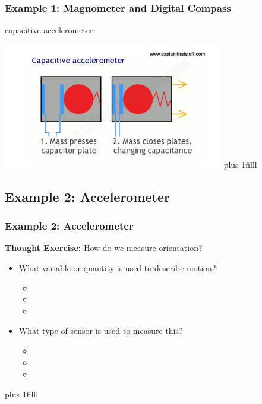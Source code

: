 \documentclass[fleqn]{beamer} %
\newcommand{\sectionIIsubsectionIIItitle}{Example 1: Magnometer and Digital Compass}
\newcommand{\sectionIIsubsectionIVtitle}{Example 2: Accelerometer}
\newcommand{\btVFill}{\vskip0pt plus 1filll}
\begin{document}
			\begin{frame}
			\frametitle{\sectionIIsubsectionIIItitle}

				capacitive accelerometer                                
 
			 	\includegraphics[scale=.55]{images/Capacitance.png}
			    \btVFill

			\end{frame}

		\subsection{\sectionIIsubsectionIVtitle}\label{sectionIIsubsectionIV}

			\begin{frame}
				\frametitle{\sectionIIsubsectionIVtitle}

					{\bf Thought Exercise:} How do we measure {\BL orientation}?        
	
					\begin{itemize}
					
						\item What variable or quantity is used to describe motion?                         
						\begin{itemize}
							\item
							\item
							\item	
						\end{itemize} \vspace{5mm}
						\item What type of sensor is used to measure this?
						\begin{itemize}
							\item
							\item
							\item	
						\end{itemize}	

					\end{itemize}
				
				\btVFill


			\end{frame}
\end{document}

